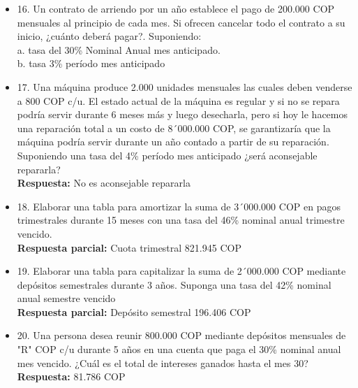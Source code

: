 \begin{itemize}
 \item 16. Un contrato de arriendo por un año establece el pago de 200.000 COP mensuales al principio de cada mes. Si ofrecen cancelar todo el contrato a su inicio, ¿cuánto deberá pagar?. Suponiendo:\\
       a. tasa del 30\% Nominal Anual mes anticipado.\\
       b. tasa 3\% período mes anticipado \\
       \medskip

 \item 17. Una máquina produce 2.000 unidades mensuales las cuales deben venderse a 800 COP c/u. El estado actual de la máquina es regular y si no se repara podría servir durante 6 meses más y luego desecharla, pero si hoy le hacemos una reparación total a un costo de 8´000.000 COP, se garantizaría que la máquina podría servir durante un año contado a partir de su reparación. Suponiendo una tasa del 4\% período mes anticipado ¿será aconsejable repararla?\\
       \textbf{Respuesta:} No es aconsejable repararla\\
       \medskip

 \item 18. Elaborar una tabla para amortizar la suma de 3´000.000 COP en pagos trimestrales durante 15 meses con una tasa del 46\% nominal anual trimestre vencido.\\
       \textbf{Respuesta parcial:} Cuota trimestral 821.945 COP \\
       \medskip

 \item 19. Elaborar una tabla para capitalizar la suma de 2´000.000 COP mediante depósitos semestrales durante 3 años. Suponga una tasa del 42\% nominal anual semestre vencido\\
       \textbf{Respuesta parcial:} Depósito semestral 196.406 COP \\
       \medskip

 \item 20. Una persona desea reunir 800.000 COP mediante depósitos mensuales de "R" COP c/u durante 5 años en una cuenta que paga el 30\% nominal anual mes vencido. ¿Cuál es el total de intereses ganados hasta el mes 30?\\
       \textbf{Respuesta:} 81.786 COP\\
       \medskip


\end{itemize}
